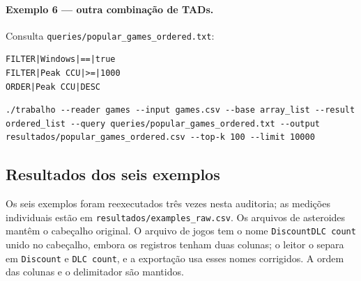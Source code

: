 \documentclass[11pt,a4paper]{article}
\begin{document}
\paragraph{Exemplo 6 --- outra combinação de TADs.} Consulta \texttt{queries/\allowbreak{}popular\_\allowbreak{}games\_\allowbreak{}ordered.txt}:
\begin{lstlisting}
FILTER|Windows|==|true
FILTER|Peak CCU|>=|1000
ORDER|Peak CCU|DESC
\end{lstlisting}
\begin{lstlisting}
./trabalho --reader games --input games.csv --base array_list --result ordered_list --query queries/popular_games_ordered.txt --output resultados/popular_games_ordered.csv --top-k 100 --limit 10000
\end{lstlisting}

\subsection{Resultados dos seis exemplos}

Os seis exemplos foram reexecutados três vezes nesta auditoria; as medições individuais estão em \texttt{resultados/examples\_raw.csv}. Os arquivos de asteroides mantêm o cabeçalho original. O arquivo de jogos tem o nome \texttt{DiscountDLC count} unido no cabeçalho, embora os registros tenham duas colunas; o leitor o separa em \texttt{Discount} e \texttt{DLC count}, e a exportação usa esses nomes corrigidos. A ordem das colunas e o delimitador são mantidos.
\end{document}
